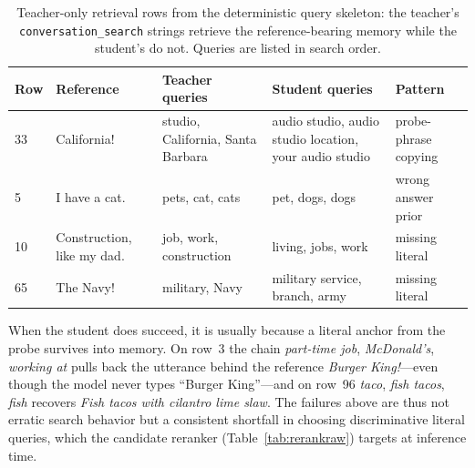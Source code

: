 \documentclass[11pt]{article}
\newcommand{\tool}[1]{\texttt{#1}}
\begin{document}
\begin{table}[t]
\centering
\small
\begin{tabularx}{\textwidth}{l l X X l}
\toprule
\textbf{Row} & \textbf{Reference} & \textbf{Teacher queries} & \textbf{Student queries} & \textbf{Pattern} \\
\midrule
33 & California! & studio, California, Santa Barbara & audio studio, audio studio location, your audio studio & probe-phrase copying \\
5 & I have a cat. & pets, cat, cats & pet, dogs, dogs & wrong answer prior \\
10 & Construction, like my dad. & job, work, construction & living, jobs, work & missing literal \\
65 & The Navy! & military, Navy & military service, branch, army & missing literal \\
\bottomrule
\end{tabularx}
\caption{Teacher-only retrieval rows from the deterministic query skeleton: the teacher's \tool{conversation\_search} strings retrieve the reference-bearing memory while the student's do not. Queries are listed in search order.}
\label{tab:examples}
\end{table}

When the student does succeed, it is usually because a literal anchor from the probe survives into memory. On row~3 the chain \emph{part-time job}, \emph{McDonald's}, \emph{working at} pulls back the utterance behind the reference \emph{Burger King!}---even though the model never types ``Burger King''---and on row~96 \emph{taco}, \emph{fish tacos}, \emph{fish} recovers \emph{Fish tacos with cilantro lime slaw}. The failures above are thus not erratic search behavior but a consistent shortfall in choosing discriminative literal queries, which the candidate reranker (Table~\ref{tab:rerankraw}) targets at inference time.
\end{document}
